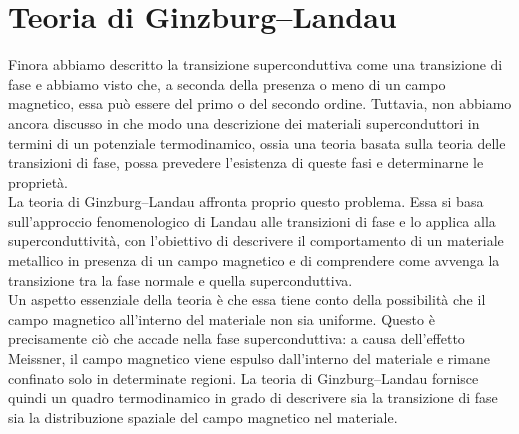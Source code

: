 \section{Teoria di Ginzburg--Landau}
Finora abbiamo descritto la transizione superconduttiva come una transizione di fase e abbiamo visto che, a seconda della presenza o meno di un campo magnetico, essa può essere del primo o del secondo ordine. Tuttavia, non abbiamo ancora discusso in che modo una descrizione dei materiali superconduttori in termini di un potenziale termodinamico, ossia una teoria basata sulla teoria delle transizioni di fase, possa prevedere l'esistenza di queste fasi e determinarne le proprietà.\\
La teoria di Ginzburg--Landau affronta proprio questo problema. Essa si basa sull'approccio fenomenologico di Landau alle transizioni di fase e lo applica alla superconduttività, con l'obiettivo di descrivere il comportamento di un materiale metallico in presenza di un campo magnetico e di comprendere come avvenga la transizione tra la fase normale e quella superconduttiva.\\
Un aspetto essenziale della teoria è che essa tiene conto della possibilità che il campo magnetico all'interno del materiale non sia uniforme. Questo è precisamente ciò che accade nella fase superconduttiva: a causa dell'effetto Meissner, il campo magnetico viene espulso dall'interno del materiale e rimane confinato solo in determinate regioni. La teoria di Ginzburg--Landau fornisce quindi un quadro termodinamico in grado di descrivere sia la transizione di fase sia la distribuzione spaziale del campo magnetico nel materiale.
